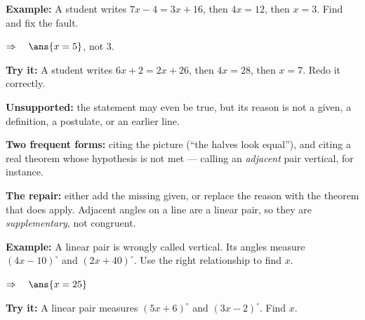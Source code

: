 \documentclass[12pt]{article}
\begin{document}
\begin{examplebox}
\textbf{Example:} \quad A student writes $7x - 4 = 3x + 16$, then $4x = 12$, then $x = 3$. Find and fix the fault.

$\Rightarrow\quad \ans{x = 5}$, not $3$.
\end{examplebox}

\begin{tryitbox}
\textbf{Try it:} \quad A student writes $6x + 2 = 2x + 26$, then $4x = 28$, then $x = 7$. Redo it correctly.\\[2pt]
\end{tryitbox}


\begin{formulabox}
\textbf{Unsupported:} the statement may even be true, but its reason is not a given, a definition, a postulate, or an earlier line.\par
\textbf{Two frequent forms:} citing the picture (``the halves look equal''), and citing a real theorem whose hypothesis is not met --- calling an \emph{adjacent} pair vertical, for instance.\par
\textbf{The repair:} either add the missing given, or replace the reason with the theorem that does apply. Adjacent angles on a line are a linear pair, so they are \emph{supplementary}, not congruent.
\end{formulabox}

\begin{examplebox}
\textbf{Example:} \quad A linear pair is wrongly called vertical. Its angles measure $(4x - 10)^\circ$ and $(2x + 40)^\circ$. Use the right relationship to find $x$.

$\Rightarrow\quad \ans{x = 25}$
\end{examplebox}

\begin{tryitbox}
\textbf{Try it:} \quad A linear pair measures $(5x + 6)^\circ$ and $(3x - 2)^\circ$. Find $x$.\\[2pt]
\end{tryitbox}
\end{document}
